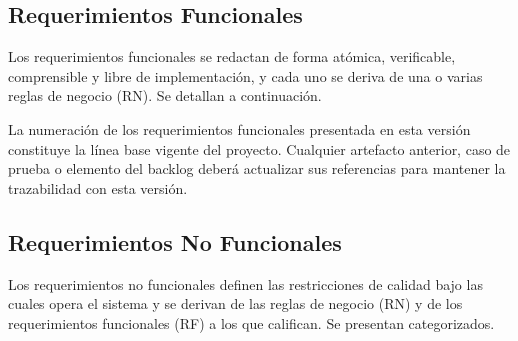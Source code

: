 \clearpage
\subsection{Requerimientos Funcionales}
Los requerimientos funcionales se redactan de forma atómica, verificable, comprensible y libre de implementación, y cada uno se deriva de una o varias reglas de negocio (RN). Se detallan a continuación.

La numeración de los requerimientos funcionales presentada en esta versión constituye la línea base vigente del proyecto. Cualquier artefacto anterior, caso de prueba o elemento del backlog deberá actualizar sus referencias para mantener la trazabilidad con esta versión.

\begingroup\small

\endgroup

\subsection{Requerimientos No Funcionales}
Los requerimientos no funcionales definen las restricciones de calidad bajo las cuales opera el sistema y se derivan de las reglas de negocio (RN) y de los requerimientos funcionales (RF) a los que califican. Se presentan categorizados.

\begingroup\small

\endgroup
